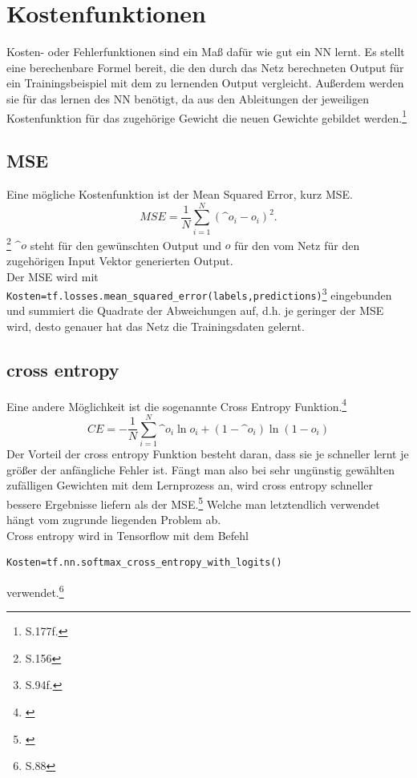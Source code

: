 \section{Kostenfunktionen}
Kosten- oder Fehlerfunktionen sind ein Maß dafür wie gut ein \gls{NN} lernt. Es stellt eine berechenbare Formel bereit, die den durch das Netz berechneten Output für ein Trainingsbeispiel mit dem zu lernenden Output vergleicht. Außerdem werden sie für das lernen des \gls{NN} benötigt, da aus den Ableitungen der jeweiligen Kostenfunktion für das zugehörige Gewicht die neuen Gewichte gebildet werden.\footnote{\cite{Goodfellow}S.177f.}
\subsection{MSE}
Eine mögliche Kostenfunktion ist der Mean Squared Error, kurz MSE.
\begin{equation}
MSE=\frac{1}{N}\sum_{i=1}^{N} (\^{o}_i-o_i)^2.
\end{equation}\footnote{\cite{Rojas1996}S.156}
$\^{o}$ steht für den gewünschten Output und $o$ für den vom Netz für den zugehörigen Input Vektor generierten Output.\\
Der MSE wird mit  \lstinline$Kosten=tf.losses.mean_squared_error(labels,predictions)$\footnote{\cite{cookbook}S.94f.} eingebunden und summiert die Quadrate der Abweichungen auf, d.h. je geringer der MSE wird, desto genauer hat das Netz die Trainingsdaten gelernt.
\subsection{cross entropy}
Eine andere Möglichkeit ist die sogenannte Cross Entropy Funktion.\footnote{\cite{Nielsen}}
\begin{equation}
CE= - \frac{1}{N} \sum_{i=1}^{N}\^{o}_i \ln o_i + (1- \^{o}_i) \ln (1-o_i)
\end{equation}
Der Vorteil der cross entropy Funktion besteht daran, dass sie je schneller lernt je größer der anfängliche Fehler ist. Fängt man also bei sehr ungünstig gewählten zufälligen Gewichten mit dem Lernprozess an, wird cross entropy schneller bessere Ergebnisse liefern als der MSE.\footnote{\cite{Nielsen}} Welche man letztendlich verwendet hängt vom zugrunde liegenden Problem ab.\\
Cross entropy wird in Tensorflow mit dem Befehl 
\begin{lstlisting}
Kosten=tf.nn.softmax_cross_entropy_with_logits()
\end{lstlisting}verwendet.\footnote{\cite{cookbook}S.88}

